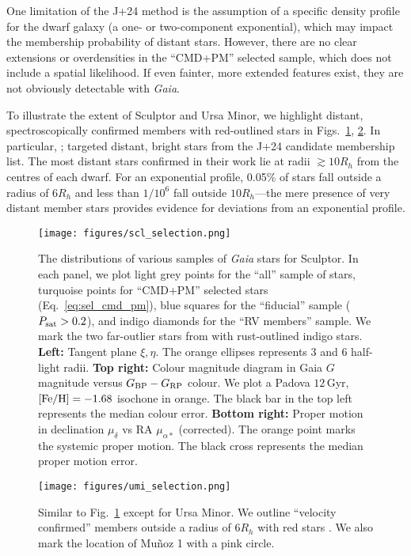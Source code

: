 One limitation of the J+24 method is the assumption of a specific
density profile for the dwarf galaxy (a one- or two-component
exponential), which may impact the membership probability of distant
stars. However, there are no clear extensions or overdensities in the
``CMD+PM'' selected sample, which does not include a spatial likelihood.
If even fainter, more extended features exist, they are not obviously
detectable with \emph{Gaia}.

To illustrate the extent of Sculptor and Ursa Minor, we highlight
distant, spectroscopically confirmed members with red-outlined stars in
Figs.~\ref{fig:scl_selection}, \ref{fig:umi_selection}. In particular,
\citet{sestito+2023a}; \citet{sestito+2023b} targeted distant, bright
stars from the J+24 candidate membership list. The most distant stars
confirmed in their work lie at radii \(\gtrsim 10 R_h\) from the centres
of each dwarf. For an exponential profile, 0.05\% of stars fall outside
a radius of \(6R_h\) and less than \(1/10^6\) fall outside
\(10R_h\)---the mere presence of very distant member stars provides
evidence for deviations from an exponential profile.

\begin{figure}
\centering
\texttt{[image: figures/scl\_selection.png]}
\caption[Sculptor sample selection]{The distributions of various samples
of \emph{Gaia} stars for Sculptor. In each panel, we plot light grey
points for the ``all'' sample of stars, turquoise points for ``CMD+PM''
selected stars (Eq.~\ref{eq:sel_cmd_pm}), blue squares for the
``fiducial'' sample (\(P_{\rm sat} > 0.2\)), and indigo diamonds for the
``RV members'' sample. We mark the two far-outlier stars from
\citet{sestito+2023a} with rust-outlined indigo stars. \textbf{Left:}
Tangent plane \(\xi, \eta\). The orange ellipses represents 3 and 6
half-light radii. \textbf{Top right:} Colour magnitude diagram in Gaia
\(G\) magnitude versus \(G_{\rm BP} - G_{\rm RP}\) colour. We plot a
Padova \(12\,\)Gyr, \({\rm [Fe/H] }=-1.68\) isochone in orange. The
black bar in the top left represents the median colour error.
\textbf{Bottom right:} Proper motion in declination \(\mu_\delta\) vs RA
\(\mu_{\alpha*}\) (corrected). The orange point marks the systemic
\citet{MV2020b} proper motion. The black cross represents the median
proper motion error.}\label{fig:scl_selection}
\end{figure}

\begin{figure}
\centering
\texttt{[image: figures/umi\_selection.png]}
\caption[Ursa Minor sample selection]{Similar to
Fig.~\ref{fig:scl_selection} except for Ursa Minor. We outline
``velocity confirmed'' members outside a radius of \(6R_h\) with red
stars \citep[from][]{sestito+2023b, pace+2020, spencer+2018}. We also
mark the location of Muñoz 1 with a pink
circle.}\label{fig:umi_selection}
\end{figure}

